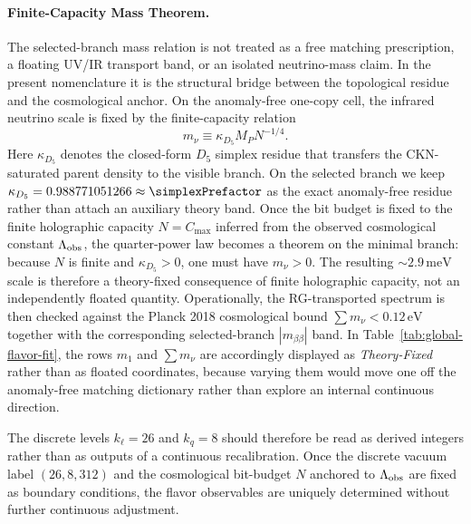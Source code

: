 \documentclass[11pt]{article}
\begin{document}
\paragraph{Finite-Capacity Mass Theorem.} The selected-branch mass relation is not treated as a free matching prescription, a floating UV/IR transport band, or an isolated neutrino-mass claim. In the present nomenclature it is the structural bridge between the topological residue and the cosmological anchor. On the anomaly-free one-copy cell, the infrared neutrino scale is fixed by the finite-capacity relation
\begin{equation}
 m_\nu \equiv \kappa_{D_5} M_P N^{-1/4}.
\end{equation}
Here $\kappa_{D_5}$ denotes the closed-form $D_5$ simplex residue that transfers the CKN-saturated parent density to the visible branch. On the selected branch we keep $\kappa_{D_5}=0.988771051266\approx\simplexPrefactor$ as the exact anomaly-free residue rather than attach an auxiliary theory band. Once the bit budget is fixed to the finite holographic capacity $N=C_{\max}$ inferred from the observed cosmological constant $\Lambda_{\rm obs}$, the quarter-power law becomes a theorem on the minimal branch: because $N$ is finite and $\kappa_{D_5}>0$, one must have $m_\nu>0$. The resulting $\sim2.9\,\mathrm{meV}$ scale is therefore a theory-fixed consequence of finite holographic capacity, not an independently floated quantity. Operationally, the RG-transported spectrum is then checked against the Planck 2018 cosmological bound $\sum m_\nu < 0.12\,\mathrm{eV}$ together with the corresponding selected-branch $|m_{\beta\beta}|$ band. In Table~\ref{tab:global-flavor-fit}, the rows $m_1$ and $\sum m_\nu$ are accordingly displayed as \emph{Theory-Fixed} rather than as floated coordinates, because varying them would move one off the anomaly-free matching dictionary rather than explore an internal continuous direction.

The discrete levels $k_{\ell}=26$ and $k_q=8$ should therefore be read as derived integers rather than as outputs of a continuous recalibration. Once the discrete vacuum label $(26,8,312)$ and the cosmological bit-budget $N$ anchored to $\Lambda_{\rm obs}$ are fixed as boundary conditions, the flavor observables are uniquely determined without further continuous adjustment.
\end{document}
